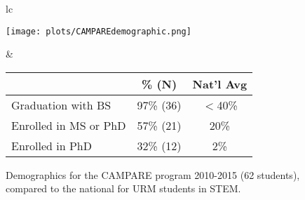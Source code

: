 \documentclass[preprint,11pt]{aastex}
\begin{document}
\begin{figure}[b!]
  \vspace{-15pt}
  \begin{tabular}{lc}
      \begin{minipage}{3in}
	\begin{center}
	  \vspace{-0.1in}
	  \hspace{-0.1in}
	  \texttt{[image: plots/CAMPAREdemographic.png]}
	\end{center}
      \end{minipage} &
      \begin{minipage}{3in}
	\begin{center}
	  \hspace{-0.15in}
\small
\begin{tabular}{|l|c|c|}
\hline
	&   \textbf{\% (N)}	  &  \textbf{Nat'l Avg} \\ 
\hline
Graduation with BS &	97\% (36)	& $<$40\% \\ \hline
Enrolled in MS or PhD 	 & 57\% (21)	&   20\%  \\ \hline
Enrolled in PhD   &  	32\% (12) &	 2\% \\ \hline
\end{tabular}
	  \end{center}
	  \vspace{-14pt}
	  \caption{Demographics for the CAMPARE program 2010-2015 (62 students), compared to the national for URM students in STEM.}
	  \label{fig:CAMPAREdemographics}  
      \end{minipage}
  \end{tabular}
  \vspace{-13pt}
\end{figure}
\end{document}
